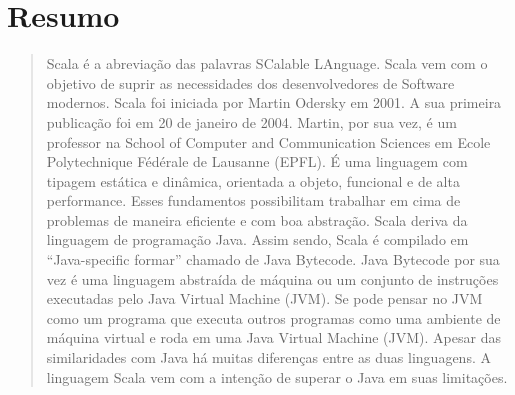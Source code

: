 

\chapter{Resumo}


\begin{quote}



   Scala é a abreviação das palavras SCalable LAnguage. Scala vem com o objetivo de suprir as necessidades dos desenvolvedores de Software modernos. Scala foi iniciada por Martin Odersky em 2001. A sua primeira publicação foi em 20 de janeiro de 2004. Martin, por sua vez, é um professor na  School of Computer and Communication Sciences em Ecole Polytechnique Fédérale de Lausanne (EPFL). É uma linguagem com tipagem estática e dinâmica, orientada a objeto, funcional e de alta performance. Esses fundamentos possibilitam trabalhar em cima de problemas de maneira eficiente e com boa abstração.
   Scala deriva da linguagem de programação Java. Assim sendo, Scala é compilado em “Java-specific formar”  chamado de Java Bytecode.  Java Bytecode por sua vez é uma linguagem abstraída de máquina ou um conjunto de instruções executadas pelo Java Virtual Machine (JVM). Se pode pensar no JVM como um programa que executa outros programas como uma ambiente de máquina virtual  e roda em uma Java Virtual Machine (JVM).
   Apesar das similaridades com Java há muitas diferenças entre as duas linguagens. A linguagem Scala vem com a intenção de superar o Java em suas limitações.
\end{quote}

